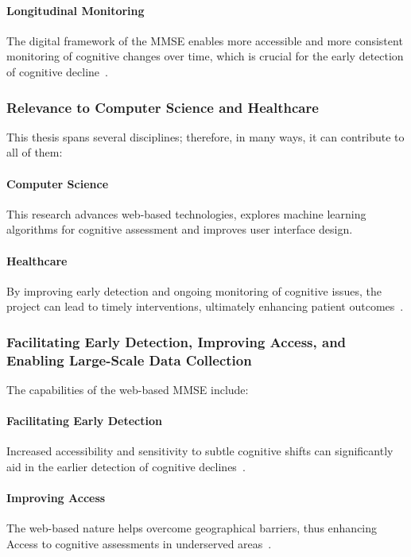 \paragraph{Longitudinal Monitoring} The digital framework of the MMSE enables more accessible and more consistent monitoring of cognitive changes over time, which is crucial for the early detection of cognitive decline~\cite{Lim2020}.

\subsubsection{Relevance to Computer Science and Healthcare}

This thesis spans several disciplines; therefore, in many ways, it can contribute to all of them:

\paragraph{Computer Science} This research advances web-based technologies, explores machine learning algorithms for cognitive assessment and improves user interface design.

\paragraph{Healthcare} By improving early detection and ongoing monitoring of cognitive issues, the project can lead to timely interventions, ultimately enhancing patient outcomes~\cite{Petersen2018}.

\subsubsection{Facilitating Early Detection, Improving Access, and Enabling Large-Scale Data Collection}

The capabilities of the web-based MMSE include:

\paragraph{Facilitating Early Detection} Increased accessibility and sensitivity to subtle cognitive shifts can significantly aid in the earlier detection of cognitive declines~\cite{Sperling2011}.

\paragraph{Improving Access} The web-based nature helps overcome geographical barriers, thus enhancing Access to cognitive assessments in underserved areas~\cite{Seifan2015}.

